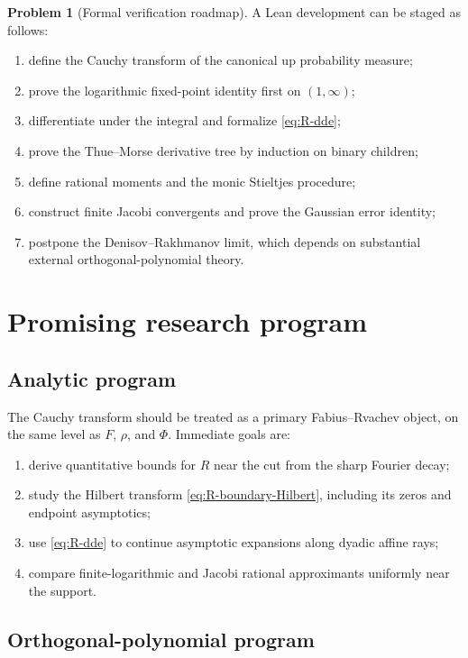 \documentclass[11pt]{article}
\theoremstyle{definition}
\newtheorem{problem}[theorem]{Problem}
\theoremstyle{remark}
\begin{document}
\begin{problem}[Formal verification roadmap]
A Lean development can be staged as follows:
\begin{enumerate}
\item define the Cauchy transform of the canonical up probability measure;
\item prove the logarithmic fixed-point identity first on \((1,\infty)\);
\item differentiate under the integral and formalize \eqref{eq:R-dde};
\item prove the Thue--Morse derivative tree by induction on binary children;
\item define rational moments and the monic Stieltjes procedure;
\item construct finite Jacobi convergents and prove the Gaussian error identity;
\item postpone the Denisov--Rakhmanov limit, which depends on substantial external
      orthogonal-polynomial theory.
\end{enumerate}
\end{problem}

\section{Promising research program}

\subsection{Analytic program}

The Cauchy transform should be treated as a primary Fabius--Rvachev object, on the same
level as \(F\), \(\rho\), and \(\Phi\).  Immediate goals are:

\begin{enumerate}
\item derive quantitative bounds for \(R\) near the cut from the sharp Fourier decay;
\item study the Hilbert transform \eqref{eq:R-boundary-Hilbert}, including its zeros and
      endpoint asymptotics;
\item use \eqref{eq:R-dde} to continue asymptotic expansions along dyadic affine rays;
\item compare finite-logarithmic and Jacobi rational approximants uniformly near the
      support.
\end{enumerate}

\subsection{Orthogonal-polynomial program}
\end{document}
